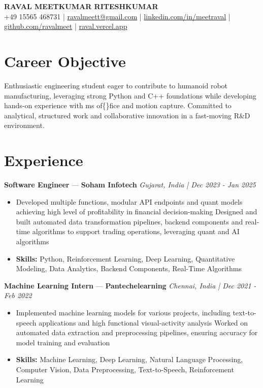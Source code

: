 \documentclass[a4paper,10pt]{article}
\begin{document}
\begin{center}
  {\Large\bfseries RAVAL MEETKUMAR RITESHKUMAR}\\[2pt]
  {\small +49 15565 468731 \;|\; \href{mailto:ravalmeett@gmail.com}{ravalmeett@gmail.com} \;|\; \href{https://www.linkedin.com/in/meetraval/}{linkedin.com/in/meetraval} \;|\; \href{https://github.com/ravalmeet}{github.com/ravalmeet} \;|\; \href{https://raval.vercel.app/}{raval.vercel.app}}
\end{center}
\vspace{-3pt}

\section*{Career Objective}
Enthusiastic engineering student eager to contribute to humanoid robot manufacturing, leveraging strong Python and C++ foundations while developing hands-on experience with ms of\{\}fice and motion capture. Committed to analytical, structured work and collaborative innovation in a fast-moving R\&D environment.\par

\section*{Experience}
\textbf{Software Engineer} — \textbf{Soham Infotech} \hfill \textit{Gujarat, India \;|\; Dec 2023 - Jan 2025}\par
\vspace{1pt}
\begin{itemize}
  \item Developed multiple functions, modular API endpoints and quant models achieving high level of profitability in financial decision-making Designed and built automated data transformation pipelines, backend components and real-time algorithms to support trading operations, leveraging quant and AI algorithms
  \item \textbf{Skills:} Python, Reinforcement Learning, Deep Learning, Quantitative Modeling, Data Analytics, Backend Components, Real-Time Algorithms
\end{itemize}
\vspace{3pt}
\textbf{Machine Learning Intern} — \textbf{Pantechelearning} \hfill \textit{Chennai, India \;|\; Dec 2021 - Feb 2022}\par
\vspace{1pt}
\begin{itemize}
  \item Implemented machine learning models for various projects, including text-to-speech applications and high functional visual-activity analysis Worked on automated data extraction and preprocessing pipelines, ensuring accuracy for model training and evaluation
  \item \textbf{Skills:} Machine Learning, Deep Learning, Natural Language Processing, Computer Vision, Data Preprocessing, Text-to-Speech, Reinforcement Learning
\end{itemize}
\end{document}
